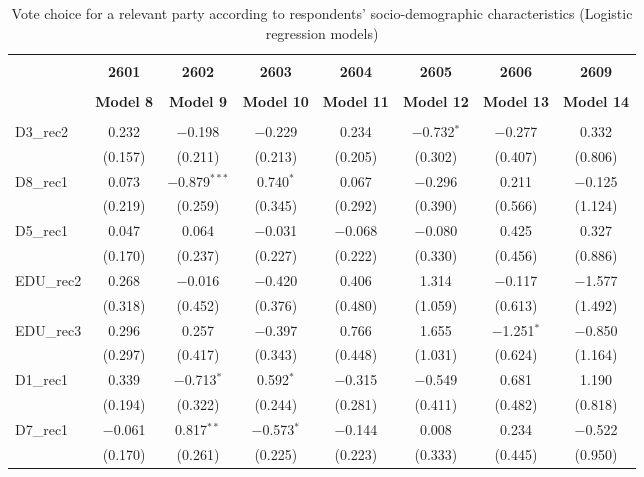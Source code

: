 \documentclass[
]{article}
\begin{document}
\begin{table}[!htbp] \centering 
  \caption{Vote choice for a relevant party according to respondents' 
                       socio-demographic characteristics (Logistic regression models)} 
  \label{table:full_logit_es} 
\begin{tabular}{@{\extracolsep{5pt}}lccccccc} 
\\[-1.8ex]\hline \\[-1.8ex] 
 & \textbf{2601} & \textbf{2602} & \textbf{2603} & \textbf{2604} & \textbf{2605} & \textbf{2606} & \textbf{2609} \\ 
\\[-1.8ex] & \textbf{Model 8} & \textbf{Model 9} & \textbf{Model 10} & \textbf{Model 11} & \textbf{Model 12} & \textbf{Model 13} & \textbf{Model 14}\\ 
\hline \\[-1.8ex] 
 D3\_rec2 & 0.232 & $-$0.198 & $-$0.229 & 0.234 & $-$0.732$^{*}$ & $-$0.277 & 0.332 \\ 
  & (0.157) & (0.211) & (0.213) & (0.205) & (0.302) & (0.407) & (0.806) \\ 
  D8\_rec1 & 0.073 & $-$0.879$^{***}$ & 0.740$^{*}$ & 0.067 & $-$0.296 & 0.211 & $-$0.125 \\ 
  & (0.219) & (0.259) & (0.345) & (0.292) & (0.390) & (0.566) & (1.124) \\ 
  D5\_rec1 & 0.047 & 0.064 & $-$0.031 & $-$0.068 & $-$0.080 & 0.425 & 0.327 \\ 
  & (0.170) & (0.237) & (0.227) & (0.222) & (0.330) & (0.456) & (0.886) \\ 
  EDU\_rec2 & 0.268 & $-$0.016 & $-$0.420 & 0.406 & 1.314 & $-$0.117 & $-$1.577 \\ 
  & (0.318) & (0.452) & (0.376) & (0.480) & (1.059) & (0.613) & (1.492) \\ 
  EDU\_rec3 & 0.296 & 0.257 & $-$0.397 & 0.766 & 1.655 & $-$1.251$^{*}$ & $-$0.850 \\ 
  & (0.297) & (0.417) & (0.343) & (0.448) & (1.031) & (0.624) & (1.164) \\ 
  D1\_rec1 & 0.339 & $-$0.713$^{*}$ & 0.592$^{*}$ & $-$0.315 & $-$0.549 & 0.681 & 1.190 \\ 
  & (0.194) & (0.322) & (0.244) & (0.281) & (0.411) & (0.482) & (0.818) \\ 
  D7\_rec1 & $-$0.061 & 0.817$^{**}$ & $-$0.573$^{*}$ & $-$0.144 & 0.008 & 0.234 & $-$0.522 \\ 
  & (0.170) & (0.261) & (0.225) & (0.223) & (0.333) & (0.445) & (0.950) \\ 

\end{tabular}
\end{table}
\end{document}
